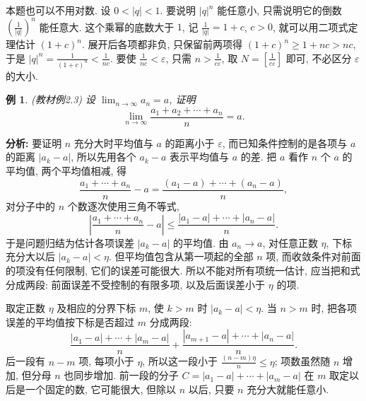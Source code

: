 \documentclass[UTF8,openany]{ctexbook}
\theoremstyle{chinesetextbook}
\newtheorem{example}{例}[section]
\begin{document}
本题也可以不用对数. 设 $0<|q|<1$. 要说明 $|q|^n$ 能任意小, 只需说明它的倒数 $\displaystyle\left(\frac1{|q|}\right)^n$ 能任意大. 这个乘幂的底数大于 $1$, 记 $\displaystyle\frac1{|q|}=1+c$, $c>0$, 就可以用二项式定理估计 $(1+c)^n$. 展开后各项都非负, 只保留前两项得 $(1+c)^n\ge1+nc>nc$, 于是 $\displaystyle|q|^n=\frac1{(1+c)^n}<\frac1{nc}$. 要使 $\displaystyle\frac1{nc}<\varepsilon$, 只需 $\displaystyle n>\frac1{c\varepsilon}$, 取 $\displaystyle N=\left[\frac1{c\varepsilon}\right]$ 即可, 不必区分 $\varepsilon$ 的大小.


\begin{example}\label{ex:2-3}
\textnormal{(教材例2.3)} 设 $\displaystyle\lim_{n\to\infty}a_n=a$, 证明
\[
\lim_{n\to\infty}\frac{a_1+a_2+\cdots+a_n}n=a.
\]
\end{example}
\par\indent\textbf{分析:} 要证明 $n$ 充分大时平均值与 $a$ 的距离小于 $\varepsilon$, 而已知条件控制的是各项与 $a$ 的距离 $|a_k-a|$, 所以先用各个 $a_k-a$ 表示平均值与 $a$ 的差. 把 $a$ 看作 $n$ 个 $a$ 的平均值, 两个平均值相减, 得
\[
\frac{a_1+\cdots+a_n}n-a=\frac{(a_1-a)+\cdots+(a_n-a)}n,
\]
对分子中的 $n$ 个数逐次使用三角不等式,
\[
\left|\frac{a_1+\cdots+a_n}n-a\right|\le\frac{|a_1-a|+\cdots+|a_n-a|}n.
\]
于是问题归结为估计各项误差 $|a_k-a|$ 的平均值. 由 $a_n\to a$, 对任意正数 $\eta$, 下标充分大以后 $|a_k-a|<\eta$. 但平均值包含从第一项起的全部 $n$ 项, 而收敛条件对前面的项没有任何限制, 它们的误差可能很大. 所以不能对所有项统一估计, 应当把和式分成两段: 前面误差不受控制的有限多项, 以及后面误差小于 $\eta$ 的项.

取定正数 $\eta$ 及相应的分界下标 $m$, 使 $k>m$ 时 $|a_k-a|<\eta$. 当 $n>m$ 时, 把各项误差的平均值按下标是否超过 $m$ 分成两段:
\[
\frac{|a_1-a|+\cdots+|a_m-a|}n+\frac{|a_{m+1}-a|+\cdots+|a_n-a|}n.
\]
后一段有 $n-m$ 项, 每项小于 $\eta$, 所以这一段小于 $\displaystyle\frac{(n-m)\eta}n\le\eta$; 项数虽然随 $n$ 增加, 但分母 $n$ 也同步增加. 前一段的分子 $C=|a_1-a|+\cdots+|a_m-a|$ 在 $m$ 取定以后是一个固定的数, 它可能很大, 但除以 $n$ 以后, 只要 $n$ 充分大就能任意小.
\end{document}
